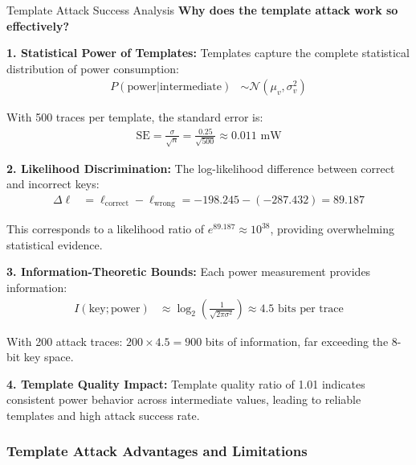 \documentclass[11pt,a4paper]{article}
\theoremstyle{definition}
\begin{document}
\begin{mathematicsbox}{Template Attack Success Analysis}
\textbf{Why does the template attack work so effectively?}

\textbf{1. Statistical Power of Templates:}
Templates capture the complete statistical distribution of power consumption:
\begin{align}
P(\text{power}|\text{intermediate}) &\sim \mathcal{N}(\mu_v, \sigma_v^2)
\end{align}

With 500 traces per template, the standard error is:
\begin{align}
\text{SE} = \frac{\sigma}{\sqrt{n}} = \frac{0.25}{\sqrt{500}} \approx 0.011 \text{ mW}
\end{align}

\textbf{2. Likelihood Discrimination:}
The log-likelihood difference between correct and incorrect keys:
\begin{align}
\Delta \ell &= \ell_{\text{correct}} - \ell_{\text{wrong}} = -198.245 - (-287.432) = 89.187
\end{align}

This corresponds to a likelihood ratio of $e^{89.187} \approx 10^{38}$, providing overwhelming statistical evidence.

\textbf{3. Information-Theoretic Bounds:}
Each power measurement provides information:
\begin{align}
I(\text{key}; \text{power}) &\approx \log_2\left(\frac{1}{\sqrt{2\pi\sigma^2}}\right) \approx 4.5 \text{ bits per trace}
\end{align}

With 200 attack traces: $200 \times 4.5 = 900$ bits of information, far exceeding the 8-bit key space.

\textbf{4. Template Quality Impact:}
Template quality ratio of 1.01 indicates consistent power behavior across intermediate values, leading to reliable templates and high attack success rate.
\end{mathematicsbox}

\subsubsection{Template Attack Advantages and Limitations}
\end{document}
